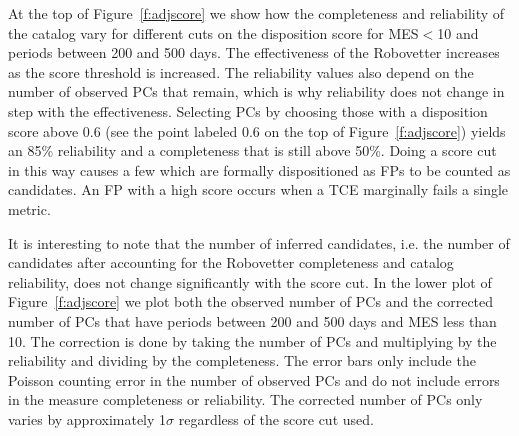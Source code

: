 At the top of Figure~\ref{f:adjscore} we show how the completeness and reliability of the catalog vary for different cuts on the disposition score for MES$<$10 and periods between 200 and 500 days. The effectiveness of the Robovetter increases as the score threshold is increased. The reliability values also depend on the number of observed PCs that remain, which is why reliability does not change in step with the effectiveness. Selecting PCs by choosing those with a disposition score above 0.6 (see the point labeled 0.6 on the top of Figure~\ref{f:adjscore}) yields an 85\% reliability and a completeness that is still above 50\%. Doing a score cut in this way causes a few  which are formally dispositioned as FPs to be counted as candidates. An FP with a high score occurs when a TCE marginally fails a single metric.  

It is interesting to note that the number of inferred candidates, i.e. the number of candidates after accounting for the Robovetter completeness and catalog reliability, does not change significantly with the score cut. In the lower plot of Figure~\ref{f:adjscore} we plot both the observed number of PCs and the corrected number of PCs that have periods between 200 and 500 days and MES less than 10.  The correction is done by taking the number of PCs and multiplying by the reliability and dividing by the completeness.  The error bars only include the Poisson counting error in the number of observed PCs and do not include errors in the measure completeness or reliability. The corrected number of PCs only varies by approximately 1$\sigma$ regardless of the score cut used.   

